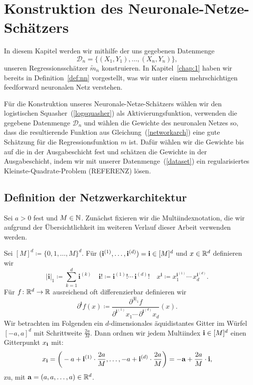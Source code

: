 \chapter{Konstruktion des Neuronale-Netze-Schätzers}
\label{chap:2}

In diesem Kapitel werden wir mithilfe der uns gegebenen Datenmenge 
\begin{equation}
\label{dataset}
\mathcal{D}_n = \{(X_1, Y_1),\dots,(X_n, Y_n)\},
\end{equation}
unseren Regressionsschätzer $\tilde{m}_n$ konstruieren. 
In Kapitel~\ref{chap:1} haben wir bereits in Definition~\ref{def:nn} vorgestellt, was wir unter einem mehrschichtigen feedforward neuronalen Netz verstehen.

Für die Konstruktion unseres Neuronale-Netze-Schätzers wählen wir den logistischen Squasher~(\ref{logsquasher}) als Aktivierungsfunktion, verwenden die gegebene Datenmenge $\mathcal{D}_n$ und wählen die Gewichte des neuronalen Netzes so, dass die resultierende Funktion aus Gleichung~(\ref{networkarch}) eine gute Schätzung für die Regressionsfunktion $m$ ist. Dafür wählen wir die Gewichte bis auf die in der Ausgabeschicht fest und schätzen die Gewichte in der Ausgabeschicht, indem wir mit unserer Datenmenge~(\ref{dataset}) ein regularisiertes Kleinste-Quadrate-Problem (REFERENZ) lösen.

\section{Definition der Netzwerkarchitektur}
Sei $a > 0$ fest und $M \in \mathbb{N}$. Zunächst fixieren wir die Multiindexnotation, die wir aufgrund der Übersichtlichkeit im weiteren Verlauf dieser Arbeit verwenden werden.

Sei $[M]^d \coloneqq\{0, 1, \dots, M\}^d.$ 
Für $(\mathbf{i}^{(1)},\dots,\mathbf{i}^{(d)}) = \mathbf{i} \in [M]^d$ und $x \in \mathbb{R}^d$ definieren wir
$$|\mathbf{i}|_1 \coloneqq \sum_{k= 1}^d \mathbf{i}^{(k)} \quad \mathbf{i}! \coloneqq \mathbf{i}^{(1)}! \cdots \, \mathbf{i}^{(d)}! \quad x^{\mathbf{i}} \coloneqq x_1^{\mathbf{i}^{(1)}} \cdots \,    x_d^{\mathbf{i}^{(d)}}.$$
Für $f\colon \mathbb{R}^d \to \mathbb{R}$ ausreichend oft differenzierbar definieren wir 
$$\partial^{\mathbf{i}}f(x) \coloneqq \frac{\partial^{|\mathbf{i}|_1}f}{\partial^{\mathbf{i}^{(1)}} x_1 \cdots \, \partial^{\mathbf{i}^{(d)}} x_d} (x).$$
Wir betrachten im Folgenden ein $d$-dimensionales äquidistantes Gitter im Würfel $[-a, a]^d$ mit Schrittweite $\frac{2a}{M}.$ 
Dann ordnen wir jedem Multiindex $\mathbf{i} \in [M]^d$ einen Gitterpunkt $x_{\mathbf{i}}$ mit:
\begin{equation}
\label{eq:gitter}
x_{\mathbf{i}} = \bigg( -a + \mathbf{i}^{(1)} \cdot \frac{2a}{M},\dots, -a + \mathbf{i}^{(d)} \cdot \frac{2a}{M}\bigg) = -\mathbf{a} + \frac{2a}{M} \cdot \mathbf{i},
\end{equation}
zu, mit $\mathbf{a} = (a, a, \dots, a) \in \mathbb{R}^d$.


